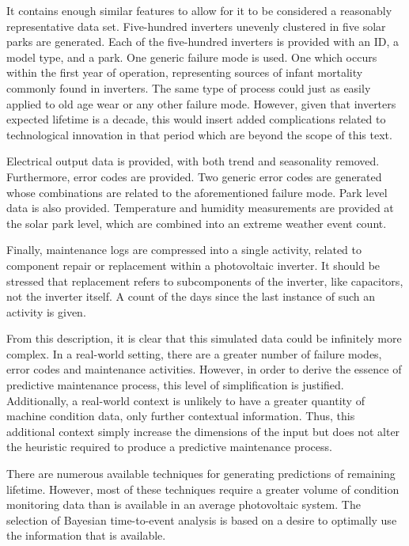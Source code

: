It contains enough similar features to allow for it to be considered a reasonably representative data set. Five-hundred inverters unevenly clustered in five solar parks are generated. Each of the five-hundred inverters is provided with an ID, a model type, and a park. One generic failure mode is used. One which occurs within the first year of operation, representing sources of infant mortality commonly found in inverters\cite{Dhere2005}. The same type of process could just as easily applied to old age wear or any other failure mode. However, given that inverters expected lifetime is a decade, this would insert added complications related to technological innovation in that period which are beyond the scope of this text.

Electrical output data is provided, with both trend and seasonality removed. Furthermore, error codes are provided. Two generic error codes are generated whose combinations are related to the aforementioned failure mode. Park level data is also provided. Temperature and humidity measurements are provided at the solar park level, which are combined into an extreme weather event count. 

Finally, maintenance logs are compressed into a single activity, related to component repair or replacement within a photovoltaic inverter. It should be stressed that replacement refers to subcomponents of the inverter, like capacitors, not the inverter itself. A count of the days since the last instance of such an activity is given.

From this description, it is clear that this simulated data could be infinitely more complex. In a real-world setting, there are a greater number of failure modes, error codes and maintenance activities. However, in order to derive the essence of predictive maintenance process, this level of simplification is justified. Additionally, a real-world context is unlikely to have a greater quantity of machine condition data, only further contextual information. Thus, this additional context simply increase the dimensions of the input but does not alter the heuristic required to produce a predictive maintenance process. 

There are numerous available techniques for generating predictions of remaining lifetime. However, most of these techniques require a greater volume of condition monitoring data than is available in an average photovoltaic system. The selection of Bayesian time-to-event analysis is based on a desire to optimally use the information that is available. 

